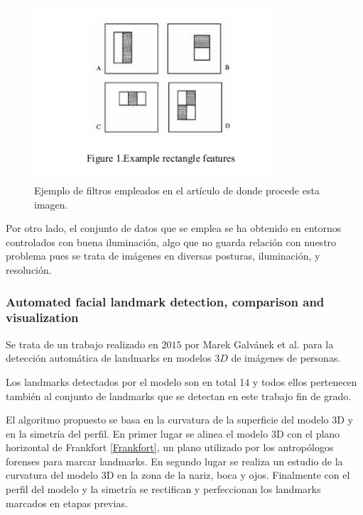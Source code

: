                 \begin{figure}[!h]
                    \centering
                    \includegraphics[width=0.8\textwidth]{img/caracteristicas_haar.png}
                    \caption{Ejemplo de filtros empleados en el artículo \cite{asi2014automatic} de donde procede esta imagen.}
                    \label{fig:asi2014}
                \end{figure}

                \medskip

                \noindent Por otro lado, el conjunto de datos que se emplea se ha obtenido en entornos controlados con buena iluminación, algo que no guarda relación con nuestro problema pues se trata de imágenes en diversas posturas, iluminación, y resolución.

            \subsubsection{Automated facial landmark detection, comparison and visualization}
                \noindent Se trata de un trabajo realizado en $2015$ por Marek Galvánek et al. \cite{galvanek2015automated} para la detección automática de landmarks en modelos $3D$ de imágenes de personas. 

                \medskip

                \noindent Los landmarks detectados por el modelo son en total 14 y todos ellos pertenecen también al conjunto de landmarks que se detectan en este trabajo fin de grado.

                \medskip

                \noindent El algoritmo propuesto se basa en la curvatura de la superficie del modelo $3$D y en la simetría del perfil. En primer lugar se alinea el modelo $3$D con el plano horizontal de Frankfort \autoref{Frankfort}, un plano utilizado por los antropólogos forenses para marcar landmarks. En segundo lugar se realiza un estudio de la curvatura del modelo $3$D en la zona de la nariz, boca y ojos. Finalmente con el perfil del modelo y la simetría se rectifican y perfeccionan los landmarks marcados en etapas previas.

